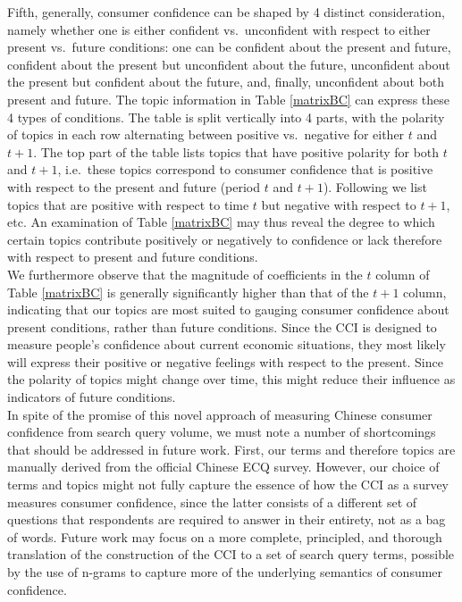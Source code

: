 \documentclass[10pt]{article}
\begin{document}
Fifth, generally, consumer confidence can be shaped by 4 distinct consideration, namely whether one is either confident vs.~unconfident with respect to either present vs.~future conditions: one can be confident about the present and future, confident about the present but unconfident about the future, unconfident about the present but confident about the future, and, finally, unconfident about both present and future. The topic information in Table \ref{matrixBC} can express these 4 types of conditions. The table is split vertically into 4 parts, with the polarity of topics in each row alternating between positive vs.~negative for either $t$ and $t+1$. The top part of the table lists topics that have positive polarity for both $t$ and $t+1$, i.e.~these topics correspond to consumer confidence that is positive with respect to the present and future (period $t$ and $t+1$). Following we list topics that are positive with respect to time $t$ but negative with respect to $t+1$, etc. An examination of Table \ref{matrixBC} may thus reveal the degree to which certain topics contribute positively or negatively to confidence or lack therefore with respect to present and future conditions.\\

We furthermore observe that the magnitude of coefficients in the $t$ column of Table \ref{matrixBC} is generally significantly higher than that of the $t+1$ column, indicating that our topics are most suited to gauging consumer confidence about present conditions, rather than future conditions. Since the CCI is designed to measure people's confidence about current economic situations, they most likely will express their positive or negative feelings with respect to the present.  Since the polarity of topics might change over time, this might reduce their influence as indicators of future conditions.\\

In spite of the promise of this novel approach of measuring Chinese consumer confidence from search query volume, we must note a number of shortcomings that should be addressed in future work.
First, our terms and therefore topics are manually derived from the official Chinese ECQ survey. However, our choice of terms and topics might not fully capture the essence of how the CCI as a survey measures consumer confidence, since the latter consists of a different set of questions that respondents are required to answer in their entirety, not as a bag of words. Future work may focus on a more complete, principled, and thorough translation of the construction of the CCI to a set of search query terms, possible by the use of n-grams to capture more of the underlying semantics of consumer confidence.\\
\end{document}
